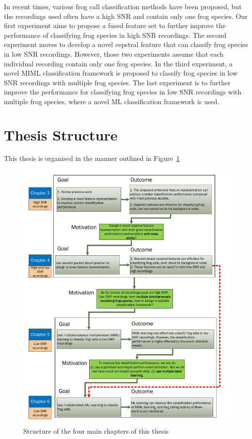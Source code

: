 In recent times, various frog call classification methods have been proposed, but the recordings used often have a high SNR and contain only one frog species. Our first experiment aims to propose a fused feature set to further improve the performance of classifying frog species in high SNR recordings. The second experiment moves to develop a novel cepstral feature that can classify frog species in low SNR recordings.
However, those two experiments assume that each individual recording contain only one frog species. In the third experiment, a novel MIML classification framework is proposed to classify frog species in low SNR recordings with multiple frog species. The last experiment is to further improve the performance for classifying frog species in low SNR recordings with multiple frog species, where a novel ML classification framework is used.



\section{Thesis Structure}

This thesis is organised in the manner outlined in Figure~\ref{fig:mainchapters}

\begin{figure}[htb!]
\centering
\includegraphics[width=\textwidth]{image/Ch1/structure_chapters.pdf}
\caption[Structure of the four main chapters of this thesis]{Structure of the four main chapters of this thesis}
\label{fig:mainchapters}
\end{figure}



